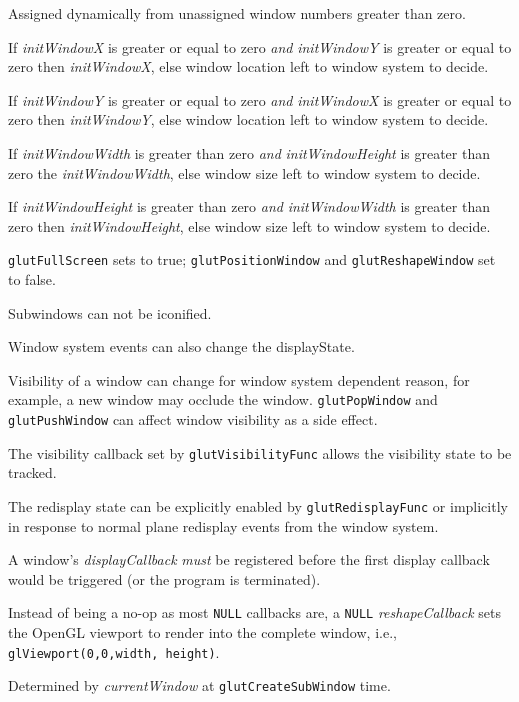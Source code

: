 \resetNote

{\footnotesize
\begin{description}
\itemsep 0in
\item[\takeNote]  Assigned dynamically from unassigned window numbers greater than zero.
\item[\takeNote]  If {\em initWindowX} is greater or equal to zero {\em and}
{\em initWindowY} is greater or equal to zero then {\em initWindowX}, else
window location left to window system to decide.
\item[\takeNote]  If {\em initWindowY} is greater or equal to zero {\em and}
{\em initWindowX} is greater or equal to zero then {\em initWindowY}, else
window location left to window system to decide.
\item[\takeNote]  If {\em initWindowWidth} is greater than zero {\em and} {\em initWindowHeight} is greater than zero
the {\em initWindowWidth}, else
window size left to window system to decide.
\item[\takeNote]  If {\em initWindowHeight} is greater than zero {\em and} {\em initWindowWidth} is greater than zero
then {\em initWindowHeight}, else
window size left to window system to decide.
\item[\takeNote]  {\tt glutFullScreen} sets to true; {\tt glutPositionWindow} and
{\tt glutReshapeWindow} set to false.
\item[\takeNote]  Subwindows can not be iconified.
\item[\takeNote]  Window system events can also change the displayState.
\item[\takeNote]  Visibility of a window can change for window system dependent reason, for
  example, a new window may occlude the window.  {\tt glutPopWindow} and {\tt glutPushWindow} can
  affect window visibility as a side effect.
\item[\takeNote]  The visibility callback set by {\tt glutVisibilityFunc} allows the visibility state to be tracked.
\item[\takeNote]  The redisplay state can be explicitly enabled by {\tt glutRedisplayFunc} or
  implicitly in response to normal plane redisplay events from the window system.
\item[\takeNote]  A window's {\em displayCallback} {\em must} be registered before the first display
  callback would be triggered (or the program is terminated).
\item[\takeNote]  Instead of being a no-op as most {\tt NULL} callbacks are, a {\tt NULL} {\em reshapeCallback}
sets the OpenGL viewport to render into the complete window, i.e., {\tt glViewport(0,0,width, height)}.
\item[\takeNote]  Determined by {\em currentWindow} at {\tt glutCreateSubWindow} time.
\end{description}
}

